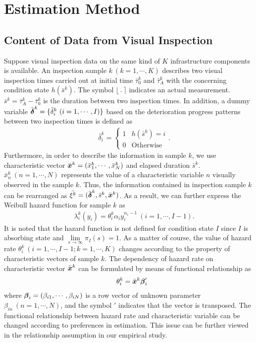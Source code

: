 \section{Estimation Method}
\label{34}
\subsection{Content of Data from Visual Inspection}
\label{341}
Suppose visual inspection data on the same kind of $K$ infrastructure components is available. An inspection sample $k~(k=1,\cdots,K)$ describes two visual inspection times carried out at initial time $\bar{\tau}_0^k$ and $\bar{\tau}_A^k$ with the concerning condition state $h(\bar{s}^k)$. The symbol $\lfloor\bar{\text{    }}\rceil$ indicates an actual measurement. $\bar{s} ^k=\bar{\tau} _ A^k-\bar{\tau} _ 0^k$ is the duration between two inspection times. In addition, a dummy variable $\bar{\mbox{\boldmath$\delta$}}^k=\{\bar{\delta}_{i}^k~(i=1,\cdots,I)\}$ based on the deterioration progress patterns between two inspection times is defined as
\begin{eqnarray}
&& \bar{\delta}_{i}^k=\left\{
\begin{array}{ll}
1 & h(\bar{s}^k)= i\\
0 & \text{Otherwise}
\end{array}.
\right.
\end{eqnarray}
Furthermore, in order to describe the information in sample $k$, we use characteristic vector  $\bar{\mbox{\boldmath$x$}}^k=(\bar{x}_1^k,\cdots,\bar{x}_N^k)$ and elapsed duration $\bar{s}^k$.  $\bar{x}_n^k~(n=1,\cdots,N)$ represents the value of a characteristic variable $n$ visually observed in the sample $k$. Thus, the information contained in inspection sample $k$ can be rearranged as  $\bar{\xi^k}=(\bar{\mbox{\boldmath$\delta$}}^k,\bar{s}^k,\bar{\mbox{\boldmath$x$}}^k)$. As a result, we can further express the Weibull hazard function for sample $k$ as
\begin{eqnarray}
&& \lambda_i^k(y_i)=\theta_i^k \alpha_{i} y_i^{\alpha_{i}-1} ~(i=1,\cdots,I-1). \label{pt26}
\end{eqnarray}
It is noted that the hazard function is not defined for condition state $I$ since $I$ is absorbing state and $\mathop{\lim}\limits_{s\to\infty}\pi_I(s) = 1$. As a matter of course, the value of hazard rate $\theta_i^k~(i=1,\cdots,I-1;k=1,\cdots,K)$ changes according to the property of characteristic vectors of sample $k$. The dependency of hazard rate on characteristic vector $\bar{\mbox{\boldmath$x$}}^k$ can be formulated by means of functional relationship as
\begin{eqnarray}
&&
\theta_i^k=\bar{\mbox{\boldmath$x$}}^k\mbox{\boldmath$\beta$}_i^\prime\label{hazard13}
\end{eqnarray}
where $\mbox{\boldmath$\beta$}_i=(\beta_{i1},\cdots,\beta_{iN})$ is a row vector of unknown parameter $\beta_{in}~(n=1,\cdots,N)$, and the symbol $\prime$ indicates that the vector is transposed. The functional relationship between hazard rate and characteristic variable can be changed according to  preferences in estimation. This issue can be further viewed in the relationship assumption in our empirical study.


